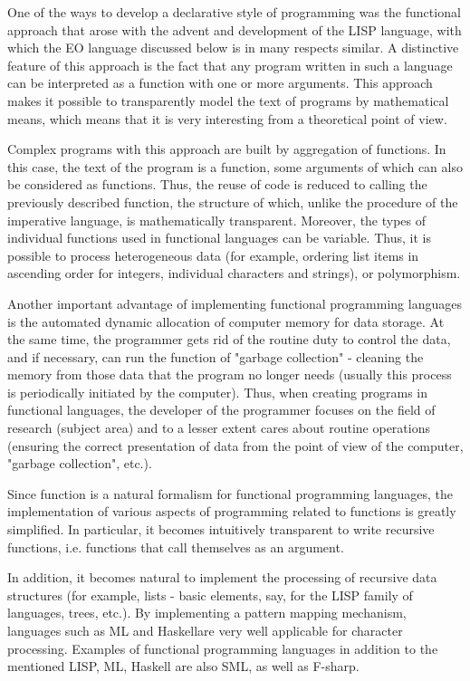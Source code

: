\documentclass[12pt]{book}
\begin{document}
One of the ways to develop a declarative style of programming was the functional approach that arose with the advent and development of the LISP language, with which the EO language discussed below is in many respects similar. A distinctive feature of this approach is the fact that any program written in such a language can be interpreted as a function with one or more arguments. This approach makes it possible to transparently model the text of programs by mathematical means, which means that it is very interesting from a theoretical point of view.

Complex programs with this approach are built by aggregation of functions. In this case, the text of the program is a function, some arguments of which can also be considered as functions. Thus, the reuse of code is reduced to calling the previously described function, the structure of which, unlike the procedure of the imperative language, is mathematically transparent. Moreover, the types of individual functions used in functional languages can be variable. Thus, it is possible to process heterogeneous data (for example, ordering list items in ascending order for integers, individual characters and strings), or polymorphism.

Another important advantage of implementing functional programming languages is the automated dynamic allocation of computer memory for data storage. At the same time, the programmer gets rid of the routine duty to control the data, and if necessary, can run the function of "garbage collection" - cleaning the memory from those data that the program no longer needs (usually this process is periodically initiated by the computer). Thus, when creating programs in functional languages, the developer of the programmer focuses on the field of research (subject area) and to a lesser extent cares about routine operations (ensuring the correct presentation of data from the point of view of the computer, "garbage collection", etc.).

Since function is a natural formalism for functional programming languages, the implementation of various aspects of programming related to functions is greatly simplified. In particular, it becomes intuitively transparent to write recursive functions, i.e.  functions that call themselves as an argument.

In addition, it becomes natural to implement the processing of recursive data structures (for example, lists - basic elements, say, for the LISP family of languages, trees, etc.). By implementing a pattern mapping mechanism, languages such as ML and Haskellare very well applicable for character processing. Examples of functional programming languages in addition to the mentioned LISP, ML, Haskell  are also SML, as well as F-sharp.
\end{document}
